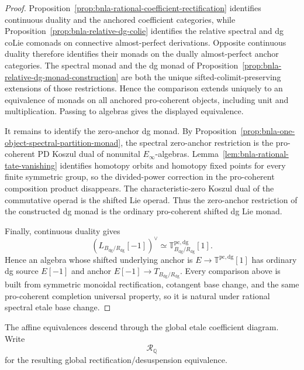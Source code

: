 \begin{proof}
Proposition~\ref{prop:bnla-rational-coefficient-rectification} identifies
continuous duality and the anchored coefficient categories, while
Proposition~\ref{prop:bnla-relative-dg-colie} identifies the relative spectral
and dg coLie comonads on connective almost-perfect derivations.  Opposite
continuous duality therefore identifies their monads on the dually
almost-perfect anchor categories.  The spectral monad and the dg monad of
Proposition~\ref{prop:bnla-relative-dg-monad-construction} are both the unique
sifted-colimit-preserving extensions of those restrictions.  Hence the
comparison extends uniquely to an equivalence of monads on all anchored
pro-coherent objects, including unit and multiplication.  Passing to algebras
gives the displayed equivalence.

It remains to identify the zero-anchor dg monad.  By
Proposition~\ref{prop:bnla-one-object-spectral-partition-monad}, the spectral
zero-anchor restriction is the pro-coherent PD Koszul dual of nonunital
$E_\infty$-algebras.  Lemma~\ref{lem:bnla-rational-tate-vanishing} identifies
homotopy orbits and homotopy fixed points for every finite symmetric group,
so the divided-power correction in the pro-coherent composition product
disappears.  The characteristic-zero Koszul dual of the commutative operad is
the shifted Lie operad.  Thus the zero-anchor restriction of the constructed
dg monad is the ordinary pro-coherent shifted dg Lie monad.

Finally, continuous duality gives
\[
    \left(L_{B_{\mathrm{dg}}/R_{\mathrm{dg}}}[-1]\right)^\vee
    \simeq
    \mathbb T^{\mathrm{pc,dg}}_{B_{\mathrm{dg}}/R_{\mathrm{dg}}}[1].
\]
Hence an algebra whose shifted underlying anchor is
$E\to\mathbb T^{\mathrm{pc,dg}}[1]$ has ordinary dg source $E[-1]$ and anchor
$E[-1]\to T_{B_{\mathrm{dg}}/R_{\mathrm{dg}}}$.  Every comparison above is
built from symmetric monoidal rectification, cotangent base change, and the
same pro-coherent completion universal property, so it is natural under
rational spectral etale base change.
\end{proof}

The affine equivalences descend through the global etale coefficient diagram.
Write
\[
    \mathcal R_{\mathbb Q}
\]
for the resulting global rectification/desuspension equivalence.

